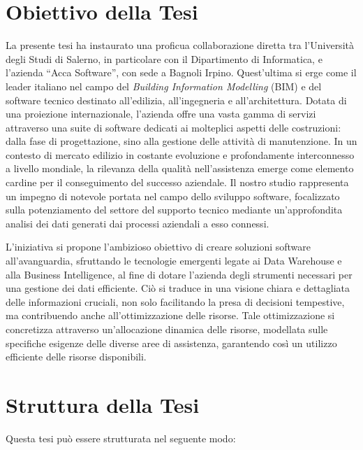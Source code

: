 \section{Obiettivo della Tesi}
La presente tesi ha instaurato una proficua collaborazione diretta tra l'Università degli Studi di Salerno, in particolare con il Dipartimento di Informatica, e l'azienda ``Acca Software'', con sede a Bagnoli Irpino. Quest'ultima si erge come il leader italiano nel campo del \textit{Building Information Modelling} (BIM) e del software tecnico destinato all'edilizia, all'ingegneria e all'architettura. Dotata di una proiezione internazionale, l'azienda offre una vasta gamma di servizi attraverso una suite di software dedicati ai molteplici aspetti delle costruzioni: dalla fase di progettazione, sino alla gestione delle attività di manutenzione. In un contesto di mercato edilizio in costante evoluzione e profondamente interconnesso a livello mondiale, la rilevanza della qualità nell'assistenza emerge come elemento cardine per il conseguimento del successo aziendale. Il nostro studio rappresenta un impegno di notevole portata nel campo dello sviluppo software, focalizzato sulla potenziamento del settore del supporto tecnico mediante un'approfondita analisi dei dati generati dai processi aziendali a esso connessi.

L'iniziativa si propone l'ambizioso obiettivo di creare soluzioni software all'avanguardia, sfruttando le tecnologie emergenti legate ai Data Warehouse e alla Business Intelligence, al fine di dotare l'azienda degli strumenti necessari per una gestione dei dati efficiente. Ciò si traduce in una visione chiara e dettagliata delle informazioni cruciali, non solo facilitando la presa di decisioni tempestive, ma contribuendo anche all'ottimizzazione delle risorse. Tale ottimizzazione si concretizza attraverso un'allocazione dinamica delle risorse, modellata sulle specifiche esigenze delle diverse aree di assistenza, garantendo così un utilizzo efficiente delle risorse disponibili.

\section{Struttura della Tesi}
Questa tesi può essere strutturata nel seguente modo:

